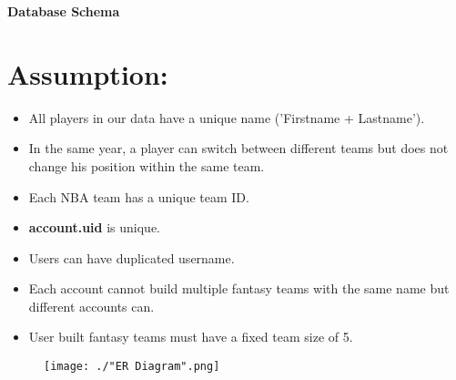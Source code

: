 \documentclass[11pt]{article}
\begin{document}
\begin{center}
{\LARGE\bf Database Schema}
\end{center}

\section*{Assumption:}

\begin{itemize}
	\item All players in our data have a unique name ('Firstname + Lastname').
	\item In the same year, a player can switch between different teams but does not change his position within the same team.
	\item Each NBA team has a unique team ID.
	\item {\bf account.uid} is unique.
	\item Users can have duplicated username.
	\item Each account cannot build multiple fantasy teams with the same name but different accounts can.
	\item User built fantasy teams must have a fixed team size of 5.
\end{itemize}

\newpage

\begin{figure} 
  \texttt{[image: ./"ER Diagram".png]}
\end{figure}
\newpage
\end{document}
